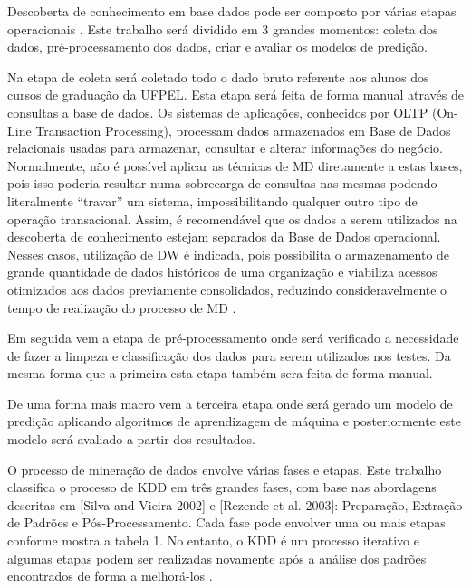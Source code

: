 \documentclass[diss-proposta,nocipinfo]{texufpel}
\begin{document}
Descoberta de conhecimento em base dados pode ser composto por várias etapas operacionais \cite{goldschmidt2015data}.
Este trabalho será dividido em 3 grandes momentos: coleta dos dados, pré-processamento dos dados, criar e avaliar os modelos de predição.

Na etapa de coleta será coletado todo o dado bruto referente aos alunos dos cursos de graduação da UFPEL. Esta etapa será feita de forma manual através de consultas a base de dados.
Os sistemas de aplicações, conhecidos por OLTP (On-Line Transaction Processing), processam dados armazenados em Base de Dados relacionais usadas para armazenar, consultar e alterar informações do negócio. Normalmente, não é possível aplicar as técnicas de MD diretamente a estas bases, pois isso poderia resultar numa sobrecarga de consultas nas mesmas podendo literalmente “travar” um sistema, impossibilitando qualquer outro tipo de operação transacional. 
Assim, é recomendável que os dados a serem utilizados na descoberta de conhecimento estejam separados da Base de Dados operacional. Nesses casos, utilização de DW é indicada, pois possibilita o armazenamento de grande quantidade de dados históricos de uma organização e viabiliza acessos otimizados aos dados previamente consolidados, reduzindo consideravelmente o tempo de realização do processo de MD \cite{Rezende2002}.

Em seguida vem a etapa de pré-processamento onde será verificado a necessidade de fazer a limpeza e classificação dos dados para serem utilizados nos testes. Da mesma forma que a primeira esta etapa também sera feita de forma manual.

De uma forma mais macro vem a terceira etapa onde será gerado um modelo de predição aplicando algoritmos de aprendizagem de máquina e posteriormente este modelo será avaliado a partir dos resultados.

O processo de mineração de dados envolve várias fases e etapas. Este trabalho classifica o processo de KDD em três grandes fases, com base nas abordagens descritas em [Silva and Vieira 2002] e [Rezende et al. 2003]: Preparação, Extração de Padrões e Pós-Processamento. Cada fase pode envolver uma ou mais etapas conforme mostra a tabela 1. No entanto, o KDD é um processo iterativo e algumas etapas podem ser realizadas novamente após a análise dos padrões encontrados de forma a melhorá-los \cite{Pimentel2006}.



\end{document}
